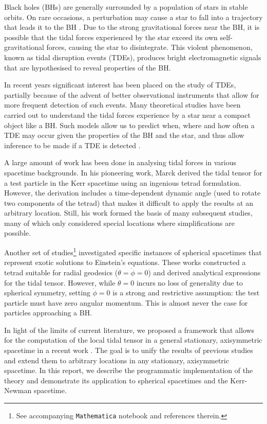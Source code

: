 \documentclass[11pt, twocolumn]{article}
\begin{document}
Black holes (BHs) are generally surrounded by a population of stars in stable orbits. On rare occasions, a perturbation may cause a star to fall into a trajectory that leads it to the BH \cite{Mummery2023}. Due to the strong gravitational forces near the BH, it is possible that the tidal forces experienced by the star exceed its own self-gravitational forces, causing the star to disintegrate. This violent phenomenon, known as tidal disruption events (TDEs), produces bright electromagnetic signals that are hypothesised to reveal properties of the BH.

In recent years significant interest has been placed on the study of TDEs, partially because of the advent of better observational instruments that allow for more frequent detection of such events. Many theoretical studies have been carried out to understand the tidal forces experience by a star near a compact object like a BH. Such models allow us to predict when, where and how often a TDE may occur given the properties of the BH and the star, and thus allow inference to be made if a TDE is detected \cite{Mummery2023, Kesden2012}.

A large amount of work has been done in analysing tidal forces in various spacetime backgrounds. In his pioneering work, Marck \cite{Marck1983} derived the tidal tensor for a test particle in the Kerr spacetime using an ingenious tetrad formulation. However, the derivation includes a time-dependent dynamic angle (used to rotate two components of the tetrad) that makes it difficult to apply the results at an arbitrary location. Still, his work formed the basis of many subsequent studies, many of which only considered special locations where simplifications are possible.

Another set of studies\footnote{See accompanying \texttt{Mathematica} notebook and references therein.} investigated specific instances of spherical spacetimes that represent exotic solutions to Einstein's equations. These works constructed a tetrad suitable for radial geodesics ($\dot{\theta} = \dot{\phi} = 0$) and derived analytical expressions for the tidal tensor. However, while $\dot{\theta} = 0$ incurs no loss of generality due to spherical symmetry, setting $\dot{\phi} = 0$ is a strong and restrictive assumption: the test particle must have zero angular momentum. This is almost never the case for particles approaching a BH.

In light of the limits of current literature, we proposed a framework that allows for the computation of the local tidal tensor in a general stationary, axisymmetric spacetime in a recent work \cite{Anonymous2024}. The goal is to unify the results of previous studies and extend them to arbitrary locations in any stationary, axisymmetric spacetime. In this report, we describe the programmatic implementation of the theory and demonstrate its application to spherical spacetimes and the Kerr-Newman spacetime.
\end{document}
